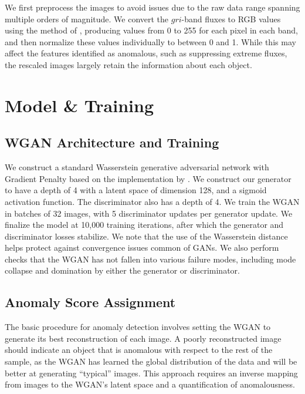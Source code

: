 \documentclass{article}
\begin{document}
We first preprocess the images to avoid issues due to the raw data range spanning multiple orders of magnitude.
We convert the $gri$-band fluxes to RGB values using the method of \citealt{Lupton2004}, producing values from 0 to 255 for each pixel in each band, and then normalize these values individually to between 0 and 1.
While this may affect the features identified as anomalous, such as suppressing extreme fluxes, the rescaled images largely retain the information about each object.\


\section{Model \& Training}

\subsection{WGAN Architecture and Training}

We construct a standard Wasserstein generative adversarial network with Gradient Penalty based on the implementation by \cite{Gulrajani2017}.
We construct our generator to have a depth of 4 with a latent space of dimension 128, and a sigmoid activation function.
The discriminator also has a depth of 4.
We train the WGAN in batches of 32 images, with 5 discriminator updates per generator update.
We finalize the model at 10,000 training iterations, after which the generator and discriminator losses stabilize.
We note that the use of the Wasserstein distance helps protect against convergence issues common of GANs.
We also perform checks that the WGAN has not fallen into various failure modes, including mode collapse and domination by either the generator or discriminator.

\subsection{Anomaly Score Assignment}

The basic procedure for anomaly detection involves setting the WGAN to generate its best reconstruction of each image.
A poorly reconstructed image should indicate an object that is anomalous with respect to the rest of the sample, as the WGAN has learned the global distribution of the data and will be better at generating ``typical'' images.
This approach requires an inverse mapping from images to the WGAN's latent space and a quantification of anomalousness.
\end{document}
